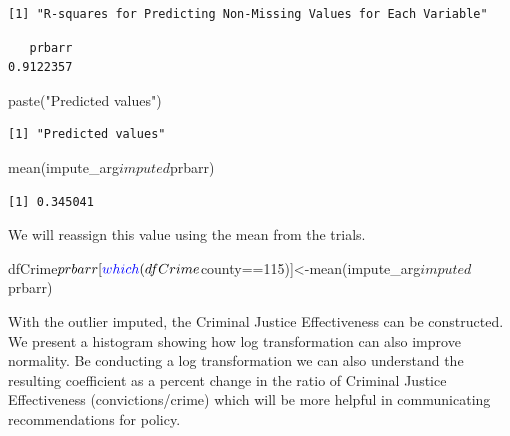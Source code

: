\documentclass[]{article}
\newenvironment{Shaded}{}{}
\newcommand{\DecValTok}[1]{#1}
\newcommand{\KeywordTok}[1]{\textcolor[rgb]{0.00,0.00,1.00}{#1}}
\newcommand{\NormalTok}[1]{#1}
\newcommand{\OperatorTok}[1]{#1}
\newcommand{\StringTok}[1]{\textcolor[rgb]{0.00,0.50,0.50}{#1}}
\begin{document}
\begin{verbatim}
[1] "R-squares for Predicting Non-Missing Values for Each Variable"
\end{verbatim}

\begin{Shaded}
\end{Shaded}

\begin{verbatim}
   prbarr 
0.9122357 
\end{verbatim}

\begin{Shaded}
\begin{Highlighting}[]
\KeywordTok{paste}\NormalTok{(}\StringTok{"Predicted values"}\NormalTok{)}
\end{Highlighting}
\end{Shaded}

\begin{verbatim}
[1] "Predicted values"
\end{verbatim}

\begin{Shaded}
\begin{Highlighting}[]
\KeywordTok{mean}\NormalTok{(impute_arg}\OperatorTok{$}\NormalTok{imputed}\OperatorTok{$}\NormalTok{prbarr)}
\end{Highlighting}
\end{Shaded}

\begin{verbatim}
[1] 0.345041
\end{verbatim}

We will reassign this value using the mean from the trials.

\begin{Shaded}
\begin{Highlighting}[]
\NormalTok{dfCrime}\OperatorTok{$}\NormalTok{prbarr[}\KeywordTok{which}\NormalTok{(dfCrime}\OperatorTok{$}\NormalTok{county}\OperatorTok{==}\DecValTok{115}\NormalTok{)]<-}\KeywordTok{mean}\NormalTok{(impute_arg}\OperatorTok{$}\NormalTok{imputed}\OperatorTok{$}\NormalTok{prbarr)}
\end{Highlighting}
\end{Shaded}

With the outlier imputed, the Criminal Justice Effectiveness can be
constructed. We present a histogram showing how log transformation can
also improve normality. Be conducting a log transformation we can also
understand the resulting coefficient as a percent change in the ratio of
Criminal Justice Effectiveness (convictions/crime) which will be more
helpful in communicating recommendations for policy.
\end{document}
